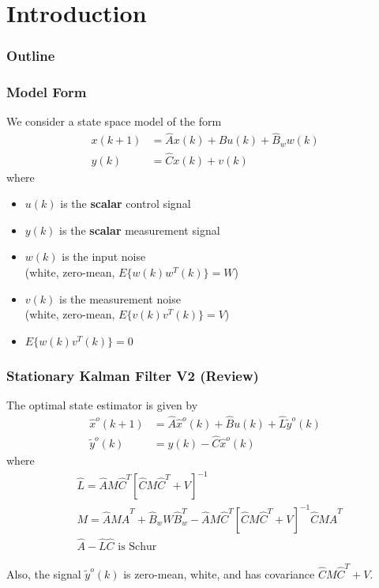 \section{Introduction}
\begin{frame}
    \frametitle{Outline}
    \tableofcontents[currentsection]
\end{frame}

\begin{frame}
    \frametitle{Model Form}

    We consider a state space model of the form
    \begin{align*}
        x(k+1) & = \hat{A} x(k) + \hat{B} u(k) + \hat{B}_w w(k) \\
        y(k) & = \hat{C} x(k) + v(k)
    \end{align*}
    where
    \begin{itemize}
        \item
        $u(k)$ is the \textbf{scalar} control signal

        \item
        $y(k)$ is the \textbf{scalar} measurement signal

        \item
        $w(k)$ is the input noise \\
        (white, zero-mean, $E\{w(k) w^T(k)\} = W$)

        \item
        $v(k)$ is the measurement noise \\
        (white, zero-mean, $E\{v(k) v^T(k)\} = V$)

        \item
        $E\{w(k) v^T(k) \} = 0$

    \end{itemize}
\end{frame}

\begin{frame}
    \frametitle{Stationary Kalman Filter V2 (Review)}

    The optimal state estimator is given by
    \begin{align*}
        \hat{x}^o(k+1) & = \hat{A} \hat{x}^o(k) + \hat{B} u(k) + \hat{L} \tilde{y}^o(k) \\
        \tilde{y}^o(k) & = y(k) - \hat{C} \hat{x}^o(k)
    \end{align*}
    where
    \begin{align*}
        & \hat{L} = \hat{A} M \hat{C}^T [\hat{C} M \hat{C}^T + V]^{-1} \\
        & M = \hat{A} M \hat{A}^T + \hat{B}_w W \hat{B}_w^T
            - \hat{A} M \hat{C}^T [\hat{C} M \hat{C}^T + V]^{-1} \hat{C} M \hat{A}^T \\
        & \hat{A} - \hat{L}\hat{C} \textrm{ is Schur}
    \end{align*}
    \paused

    Also, the signal $\tilde{y}^o(k)$ is zero-mean, white, and has covariance $\hat{C} M \hat{C}^T + V$.

\end{frame}


